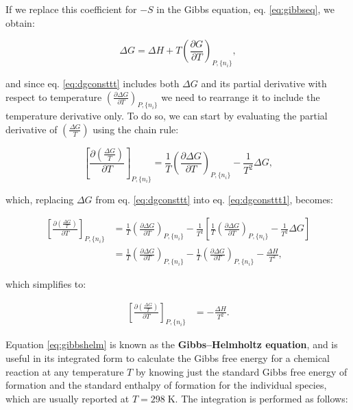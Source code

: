 \documentclass[
]{book}
\theoremstyle{definition}
\theoremstyle{definition}
\theoremstyle{definition}
\theoremstyle{remark}
\begin{document}
If we replace this coefficient for \(-S\) in the Gibbs equation, eq. \eqref{eq:gibbseq}, we obtain:

\begin{equation}
\Delta G = \Delta H + T \left(\frac{\partial G}{\partial T} \right)_{P,\{n_i\}},
\label{eq:dgconsttt}
\end{equation}

and since eq. \eqref{eq:dgconsttt} includes both \(\Delta G\) and its partial derivative with respect to temperature \(\left(\frac{\partial \Delta G}{\partial T} \right)_{P,\{n_i\}}\) we need to rearrange it to include the temperature derivative only. To do so, we can start by evaluating the partial derivative of \(\left( \frac{\Delta G}{T} \right)\) using the chain rule:

\begin{equation}
\left[ \frac{\partial\left( \frac{\Delta G}{T} \right)}{\partial T} \right]_{P,\{n_i\}} = \frac{1}{T} \left(\frac{\partial \Delta G}{\partial T}  \right)_{P,\{n_i\}} - \frac{1}{T^2}\Delta G,
\label{eq:dgconsttt1}
\end{equation}

which, replacing \(\Delta G\) from eq. \eqref{eq:dgconsttt} into eq. \eqref{eq:dgconsttt1}, becomes:

\begin{equation}
\begin{aligned}
\left[ \frac{\partial\left( \frac{\Delta G}{T} \right)}{\partial T} \right]_{P,\{n_i\}} &= \frac{1}{T} \left(\frac{\partial \Delta G}{\partial T}  \right)_{P,\{n_i\}} - \frac{1}{T^2} \left[  \frac{1}{T} \left(\frac{\partial \Delta G}{\partial T}  \right)_{P,\{n_i\}} - \frac{1}{T^2}\Delta G \right] \\
&= \frac{1}{T} \left(\frac{\partial \Delta G}{\partial T}  \right)_{P,\{n_i\}}-\frac{1}{T} \left(\frac{\partial \Delta G}{\partial T}  \right)_{P,\{n_i\}} - \frac{\Delta H}{T^2},
\end{aligned}
\label{eq:dgconsttt2}
\end{equation}

which simplifies to:

\begin{equation}
\begin{aligned}
\left[ \frac{\partial\left( \frac{\Delta G}{T} \right)}{\partial T} \right]_{P,\{n_i\}} &= - \frac{\Delta H}{T^2}.
\end{aligned}
\label{eq:gibbshelm}
\end{equation}

Equation \eqref{eq:gibbshelm} is known as the \textbf{Gibbs--Helmholtz equation}, and is useful in its integrated form to calculate the Gibbs free energy for a chemical reaction at any temperature \(T\) by knowing just the standard Gibbs free energy of formation and the standard enthalpy of formation for the individual species, which are usually reported at \(T=298\;\text{K}\). The integration is performed as follows:
\end{document}
